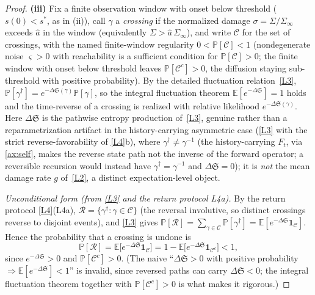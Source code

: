 \documentclass[11pt]{article}
\theoremstyle{plain}
\theoremstyle{definition}
\theoremstyle{remark}
\newcommand{\E}{\mathbb{E}}
\newcommand{\Sep}{\mathfrak{S}}
\begin{document}
\begin{proof}
\textbf{(iii)} Fix a finite observation window with onset below threshold ($s(0)<s^\ast$, as in (ii)), call $\gamma$ a \emph{crossing} if the normalized damage $\sigma=\Sigma/\Sigma_\infty$ exceeds $\hat a$ in the window (equivalently $\Sigma>\hat a\,\Sigma_\infty$), and write $\mathcal C$ for the set of crossings, with the named finite-window regularity $0<\mathbb P[\mathcal C]<1$ (nondegenerate noise $\varsigma>0$ with reachability is a sufficient condition for $\mathbb P[\mathcal C]>0$; the finite window with onset below threshold leaves $\mathbb P[\mathcal C^c]>0$, the diffusion staying sub-threshold with positive probability). By the detailed fluctuation relation~\ref{L3}, $\mathbb P[\gamma^\dagger]=e^{-\Delta\Sep(\gamma)}\mathbb P[\gamma]$, so the integral fluctuation theorem $\E[e^{-\Delta\Sep}]=1$ holds \citep{seifert2012} and the time-reverse of a crossing is realized with relative likelihood $e^{-\Delta\Sep(\gamma)}$. Here $\Delta\Sep$ is the pathwise entropy production of~\ref{L3}, genuine rather than a reparametrization artifact in the history-carrying asymmetric case (\ref{L3} with the strict reverse-favorability of \ref{L4}b), where $\gamma^\dagger\neq\gamma^{-1}$ (the history-carrying $F_t$, via \ref{ax:self}, makes the reverse state path not the inverse of the forward operator; a reversible recursion would instead have $\gamma^\dagger=\gamma^{-1}$ and $\Delta\Sep=0$); it is \emph{not} the mean damage rate $g$ of~\ref{L2}, a distinct expectation-level object.

\emph{Unconditional form (from \ref{L3} and the return protocol L4a).} By the return protocol \ref{L4}(L4a), $\mathcal R=\{\gamma^\dagger:\gamma\in\mathcal C\}$ (the reversal involutive, so distinct crossings reverse to disjoint events), and \ref{L3} gives $\mathbb P[\mathcal R]=\sum_{\gamma\in\mathcal C}\mathbb P[\gamma^\dagger]=\E[e^{-\Delta\Sep}\mathbf 1_{\mathcal C}]$. Hence the probability that a crossing is undone is
\[
\mathbb P[\mathcal R]=\E\!\big[e^{-\Delta\Sep}\mathbf 1_{\mathcal C}\big]=1-\E\!\big[e^{-\Delta\Sep}\mathbf 1_{\mathcal C^c}\big]<1,
\]
since $e^{-\Delta\Sep}>0$ and $\mathbb P[\mathcal C^c]>0$. (The naive ``$\Delta\Sep>0$ with positive probability $\Rightarrow\E[e^{-\Delta\Sep}]<1$'' is invalid, since reversed paths can carry $\Delta\Sep<0$; the integral fluctuation theorem together with $\mathbb P[\mathcal C^c]>0$ is what makes it rigorous.)


\end{proof}
\end{document}
